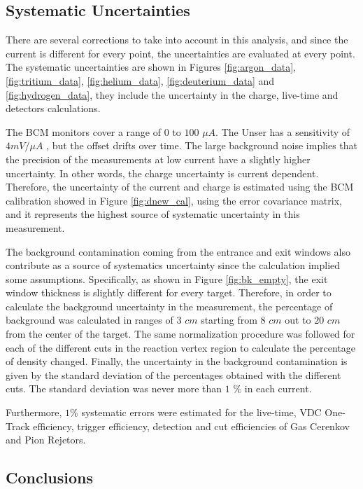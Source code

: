 \documentclass[final,5p,times,twocolumn,balance]{elsarticle}
\begin{document}
\subsection{Systematic Uncertainties}

There are several corrections to take into account in this analysis, and since the current is different for every point, the uncertainties are evaluated at every point.  The systematic uncertainties are shown in Figures  \ref{fig:argon_data}, \ref{fig:tritium_data}, \ref{fig:helium_data}, \ref{fig:deuterium_data} and \ref{fig:hydrogen_data},  they   include the uncertainty in the charge, live-time and detectors calculations.

The BCM monitors cover a range of $0$ to $100$ $\mu A$. The Unser has a sensitivity of $4 mV/ \mu A$ \citep{denard}, but the offset drifts over time. The large background noise implies that the precision of the measurements at low current have a slightly higher uncertainty. In other words, the charge uncertainty is current dependent. Therefore, the uncertainty of the current and charge is estimated using the BCM calibration showed in Figure \ref{fig:dnew_cal}, using the error covariance matrix, and it represents the highest source of systematic uncertainty in this measurement.


The background contamination coming from the entrance and exit windows also contribute as a source of systematics uncertainty since the calculation implied some assumptions. Specifically, as shown in Figure \ref{fig:bk_empty}, the exit window thickness is slightly different for every target. Therefore, in order to calculate the background uncertainty in the measurement, the percentage of background was calculated in ranges of $3$ $cm$ starting from $8$ $cm$ out to $20$ $cm$ from the center of the target.  The same normalization procedure was followed for each of the different cuts in the reaction vertex region to calculate the percentage of density changed. Finally, the uncertainty in the background contamination is given by the standard deviation of the percentages obtained with the different cuts. The standard deviation was never more than $1$ $\% $ in each current.

Furthermore, $1\% $ systematic errors were estimated for the live-time, VDC One-Track efficiency, trigger efficiency, detection and cut efficiencies of Gas Cerenkov and Pion Rejetors.

\subsection {Conclusions }
\end{document}

